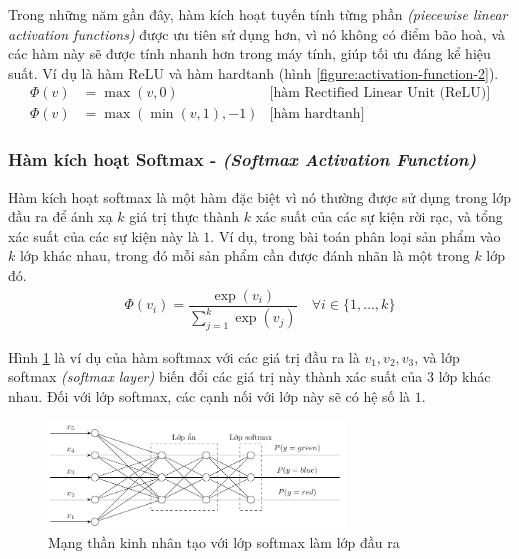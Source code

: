 Trong những năm gần đây, hàm kích hoạt tuyến tính từng phần \textit{(piecewise linear activation functions)} được ưu tiên sử dụng hơn, vì nó không có điểm bão hoà, và các hàm này sẽ được tính nhanh hơn trong máy tính, giúp tối ưu đáng kể hiệu suất. Ví dụ là hàm ReLU và hàm hardtanh (hình \ref{figure:activation-function-2}).
\begin{align}
    \Phi(v) & =\max(v,0)          & \text{[hàm Rectified Linear Unit (ReLU)]} \\
    \Phi(v) & =\max(\min(v,1),-1) & \text{[hàm hardtanh]}
\end{align}

\subsubsection{Hàm kích hoạt Softmax - \textit{(Softmax Activation Function)}}
Hàm kích hoạt softmax là một hàm đặc biệt vì nó thường được sử dụng trong lớp đầu ra để ánh xạ $k$ giá trị thực thành $k$ xác suất của các sự kiện rời rạc, và tổng xác suất của các sự kiện này là $1$. Ví dụ, trong bài toán phân loại sản phẩm vào $k$ lớp khác nhau, trong đó mỗi sản phẩm cần được đánh nhãn là một trong $k$ lớp đó.
\begin{align}
    \Phi(v_i)=\dfrac{\exp(v_i)}{\sum^k_{j=1}\exp(v_j)}\quad\forall i\in\{1,\dots,k\}
\end{align}

Hình \ref{figure:softmax-layer} là ví dụ của hàm softmax với các giá trị đầu ra là $v_1, v_2, v_3$, và lớp softmax \textit{(softmax layer)} biến đổi các giá trị này thành xác suất của $3$ lớp khác nhau. Đối với lớp softmax, các cạnh nối với lớp này sẽ có hệ số là $1$.
\begin{figure}[htb]
    \centering
    \includegraphics[width=0.7\textwidth]{tikz_image/softmax_layer.pdf}
    \caption{Mạng thần kinh nhân tạo với lớp softmax làm lớp đầu ra}
    \label{figure:softmax-layer}
\end{figure}


